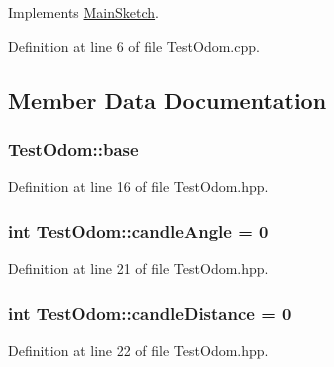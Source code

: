 Implements \hyperlink{classMainSketch_a0708e1eb0ced1063f600f4111df90bf2}{Main\-Sketch}.



Definition at line 6 of file Test\-Odom.\-cpp.



\subsection{Member Data Documentation}
\hypertarget{classTestOdom_a185b4bf8f3906701729e77109a22538a}{
\subsubsection[{base}]{ Test\-Odom\-::base\hspace{0.3cm}{\ttfamily [private]}}}\label{classTestOdom_a185b4bf8f3906701729e77109a22538a}


Definition at line 16 of file Test\-Odom.\-hpp.

\hypertarget{classTestOdom_a5645cf7c9e70140e5b7b96d3168e8006}{
\subsubsection[{candle\-Angle}]{\setlength{\rightskip}{0pt plus 5cm}int Test\-Odom\-::candle\-Angle = 0\hspace{0.3cm}{\ttfamily [private]}}}\label{classTestOdom_a5645cf7c9e70140e5b7b96d3168e8006}


Definition at line 21 of file Test\-Odom.\-hpp.

\hypertarget{classTestOdom_a64c15d32fcf64aa273cc19f210accd35}{
\subsubsection[{candle\-Distance}]{\setlength{\rightskip}{0pt plus 5cm}int Test\-Odom\-::candle\-Distance = 0\hspace{0.3cm}{\ttfamily [private]}}}\label{classTestOdom_a64c15d32fcf64aa273cc19f210accd35}


Definition at line 22 of file Test\-Odom.\-hpp.

